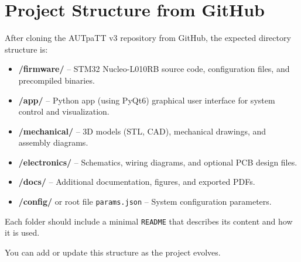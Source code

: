 \chapter{Project Structure from GitHub}

After cloning the AUTpaTT v3 repository from GitHub, the expected directory structure is:

\begin{itemize}
  \item \textbf{/firmware/} -- STM32 Nucleo-L010RB source code, configuration files, and precompiled binaries.
  \item \textbf{/app/} -- Python app (using PyQt6) graphical user interface for system control and visualization.
  \item \textbf{/mechanical/} -- 3D models (STL, CAD), mechanical drawings, and assembly diagrams.
  \item \textbf{/electronics/} -- Schematics, wiring diagrams, and optional PCB design files.
  \item \textbf{/docs/} -- Additional documentation, figures, and exported PDFs.
  \item \textbf{/config/} or root file \texttt{params.json} -- System configuration parameters.
\end{itemize}

Each folder should include a minimal \texttt{README} that describes its content and how it is used.

You can add or update this structure as the project evolves.

